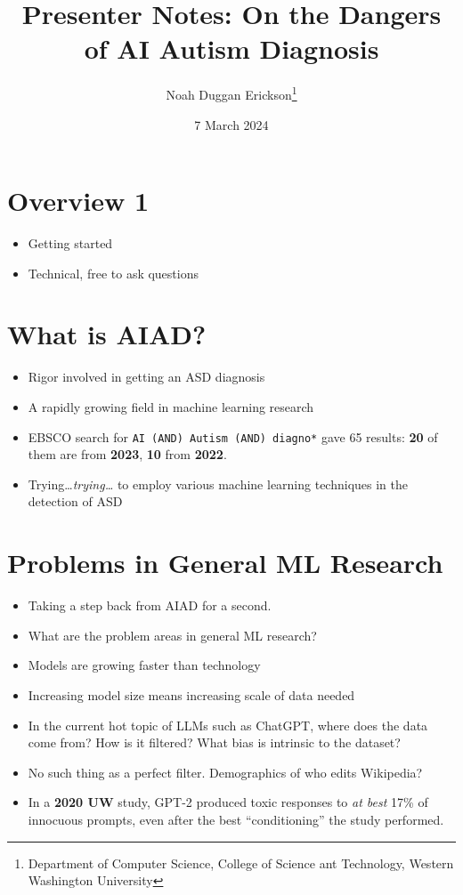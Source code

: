 \documentclass[twoside, letterpaper, twocolumn]{article}
\title{Presenter Notes: On the Dangers of AI Autism Diagnosis}
\author{Noah Duggan Erickson\thanks{Department of Computer Science, College of Science ant Technology, Western Washington University}}
\date{7 March 2024}
\begin{document}
\maketitle
\section{Overview 1}
\begin{itemize}
    \item Getting started
    \item Technical, free to ask questions
\end{itemize}
\section{What is AIAD?}
\begin{itemize}
    \item Rigor involved in getting an ASD diagnosis
    \item A rapidly growing field in machine learning research
    \item EBSCO search for \texttt{AI (AND) Autism (AND) diagno*} gave 65 results: \textbf{20} of them are from \textbf{2023}, \textbf{10} from \textbf{2022}.
    \item Trying\dots \textit{trying\dots} to employ various machine learning techniques in the detection of ASD
\end{itemize}
\section{Problems in General ML Research}
\begin{itemize}
    \item Taking a step back from AIAD for a second.
    \item What are the problem areas in general ML research?
    \item Models are growing faster than technology
    \item Increasing model size means increasing scale of data needed
    \item In the current hot topic of LLMs such as ChatGPT, where does the data come from? How is it filtered? What bias is intrinsic to the dataset? 
    \item No such thing as a perfect filter. Demographics of who edits Wikipedia?
    \item In a \textbf{2020 UW} study, GPT-2 produced toxic responses to \textit{at best} 17\% of innocuous prompts, even after the best ``conditioning'' the study performed.
\end{itemize}
\end{document}
